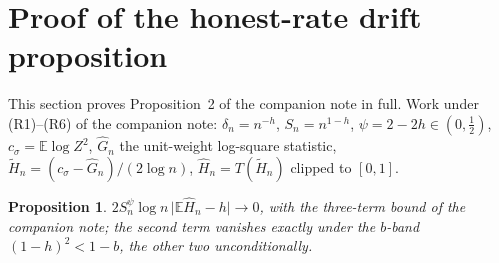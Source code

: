 \documentclass[11pt]{article}
\newtheorem{proposition}[theorem]{Proposition}
\theoremstyle{definition}
\theoremstyle{remark}
\begin{document}
\section{Proof of the honest-rate drift proposition}\label{sec:drift}

This section proves Proposition~2 of the companion note in full. Work under
(R1)--(R6) of the companion note: $\delta_n=n^{-h}$, $S_n=n^{1-h}$,
$\psi=2-2h\in(0,\tfrac12)$, $c_\sigma=\mathbb E\log Z^2$, $\widehat G_n$ the
unit-weight log-square statistic, $\widetilde H_n=(c_\sigma-\widehat
G_n)/(2\log n)$, $\widehat H_n=T(\widetilde H_n)$ clipped to $[0,1]$.

\begin{proposition}\label{prop:drift-full}
$2S_n^{\psi}\log n\,\bigl|\mathbb E\widehat H_n-h\bigr|\to0$, with the
three-term bound of the companion note; the second term vanishes exactly
under the $b$-band $(1-h)^2<1-b$, the other two unconditionally.
\end{proposition}
\end{document}

